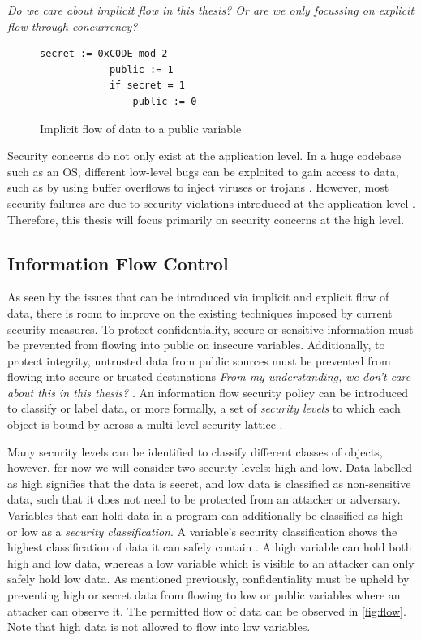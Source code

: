 \documentclass[twocolumn]{article}
\begin{document}
\textit{Do we care about implicit flow in this thesis? Or are we only focussing on explicit flow through concurrency?}


\begin{figure}
    \label{fig:implicit}
    \begin{lstlisting}[gobble=2]
            secret := 0xC0DE mod 2
            public := 1
            if secret = 1
                public := 0
        \end{lstlisting}
    \caption{Implicit flow of data to a public variable}
\end{figure}

Security concerns do not only exist at the application level. In a huge codebase such as an OS, different low-level bugs can be exploited to gain access to data, such as by using buffer overflows to inject viruses or trojans \cite{agten2012recent}. However, most security failures are due to security violations introduced at the application level \cite{jang2010empirical}. Therefore, this thesis will focus primarily on security concerns at the high level.

\subsection{Information Flow Control}
As seen by the issues that can be introduced via implicit and explicit flow of data, there is room to improve on the existing techniques imposed by current security measures. To protect confidentiality, secure or sensitive information must be prevented from flowing into public on insecure variables. Additionally, to protect integrity, untrusted data from public sources must be prevented from flowing into secure or trusted destinations \textit{From my understanding, we don't care about this in this thesis?} \cite{balliu2014logics}. An information flow security policy can be introduced to classify or label data, or more formally, a set of \textit{security levels} to which each object is bound by across a multi-level security lattice \cite{denning1976lattice}.

Many security levels can be identified to classify different classes of objects, however, for now we will consider two security levels: high and low. Data labelled as high signifies that the data is secret, and low data is classified as non-sensitive data, such that it does not need to be protected from an attacker or adversary. Variables that can hold data in a program can additionally be classified as high or low as a \textit{security classification}. A variable's security classification shows the highest classification of data it can safely contain \cite{winter2020information}. A high variable can hold both high and low data, whereas a low variable which is visible to an attacker can only safely hold low data. As mentioned previously, confidentiality must be upheld by preventing high or secret data from flowing to low or public variables where an attacker can observe it. The permitted flow of data can be observed in \ref{fig:flow}. Note that high data is not allowed to flow into low variables.
\end{document}
